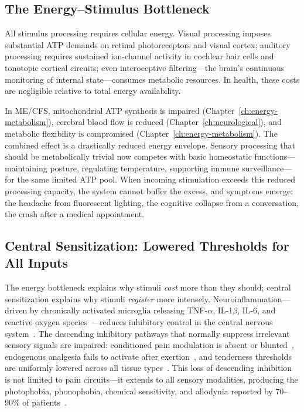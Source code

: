 \subsection{The Energy--Stimulus Bottleneck}

All stimulus processing requires cellular energy. Visual processing imposes substantial ATP demands on retinal photoreceptors and visual cortex; auditory processing requires sustained ion-channel activity in cochlear hair cells and tonotopic cortical circuits; even interoceptive filtering---the brain's continuous monitoring of internal state---consumes metabolic resources. In health, these costs are negligible relative to total energy availability.

In ME/CFS, mitochondrial ATP synthesis is impaired (Chapter~\ref{ch:energy-metabolism}), cerebral blood flow is reduced (Chapter~\ref{ch:neurological}), and metabolic flexibility is compromised (Chapter~\ref{ch:energy-metabolism}). The combined effect is a drastically reduced energy envelope. Sensory processing that should be metabolically trivial now competes with basic homeostatic functions---maintaining posture, regulating temperature, supporting immune surveillance---for the same limited ATP pool. When incoming stimulation exceeds this reduced processing capacity, the system cannot buffer the excess, and symptoms emerge: the headache from fluorescent lighting, the cognitive collapse from a conversation, the crash after a medical appointment.

\subsection{Central Sensitization: Lowered Thresholds for All Inputs}

The energy bottleneck explains why stimuli \emph{cost} more than they should; central sensitization explains why stimuli \emph{register} more intensely. Neuroinflammation---driven by chronically activated microglia releasing TNF-$\alpha$, IL-1$\beta$, IL-6, and reactive oxygen species~\cite{RenzPolster2022, Nakatomi2014Neuroinflammation}---reduces inhibitory control in the central nervous system~\cite{Nijs2017neuroinflammation}. The descending inhibitory pathways that normally suppress irrelevant sensory signals are impaired: conditioned pain modulation is absent or blunted~\cite{Nijs2012muscle}, endogenous analgesia fails to activate after exertion~\cite{Nijs2012painCFS}, and tenderness thresholds are uniformly lowered across all tissue types~\cite{Baraniuk2025NociplasticMECFS}. This loss of descending inhibition is not limited to pain circuits---it extends to all sensory modalities, producing the photophobia, phonophobia, chemical sensitivity, and allodynia reported by 70--90\% of patients~\cite{Jason2013sensory}.

